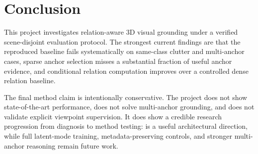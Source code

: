\section{Conclusion}

This project investigates relation-aware 3D visual grounding under a verified scene-disjoint evaluation protocol. The strongest current findings are that the reproduced baseline fails systematically on same-class clutter and multi-anchor cases, sparse anchor selection misses a substantial fraction of useful anchor evidence, and conditional relation computation improves over a controlled dense relation baseline.

The final method claim is intentionally conservative. The project does not show state-of-the-art performance, does not solve multi-anchor grounding, and does not validate explicit viewpoint supervision. It does show a credible research progression from diagnosis to method testing: \method{} is a useful architectural direction, while full latent-mode training, metadata-preserving controls, and stronger multi-anchor reasoning remain future work.
